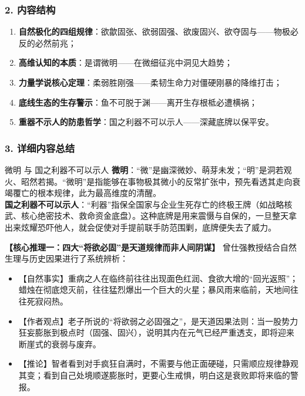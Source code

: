 \subsubsection{2. 内容结构}
\begin{enumerate}
    \item \textbf{自然极化的四组规律}：欲歙固张、欲弱固强、欲废固兴、欲夺固与——物极必反的必然前兆；
    \item \textbf{高维认知的本质}：是谓微明——在微细征兆中洞见大趋势；
    \item \textbf{力量学说核心定理}：柔弱胜刚强——柔韧生命力对僵硬刚暴的降维打击；
    \item \textbf{底线生态的生存警示}：鱼不可脱于渊——离开生存根柢必遭横祸；
    \item \textbf{重器不示人的防患哲学}：国之利器不可以示人——深藏底牌以保平安。
\end{enumerate}

\subsubsection{3. 详细内容总结}

\begin{ConceptBox}{微明 与 国之利器不可以示人}
\textbf{微明}：“微”是幽深微妙、萌芽未发；“明”是洞若观火、昭然若揭。“微明”是指能够在事物极其微小的反常扩张中，预先看透其走向衰竭覆亡的根本规律，此为最高维度的清醒。\\
\textbf{国之利器不可以示人}：“利器”指保全国家与企业生死存亡的终极王牌（如战略核武、核心绝密技术、救命资金底盘）。这种底牌是用来震慑与自保的，一旦整天拿出来炫耀恐吓他人，就会促使对手提前联手防范围剿，底牌便失去了威力。
\end{ConceptBox}

\noindent\textbf{【核心推理一：四大“将欲必固”是天道规律而非人间阴谋】}
曾仕强教授结合自然生理与历史因果进行了系统辨析：
\begin{itemize}
    \item 【自然事实】重病之人在临终前往往出现面色红润、食欲大增的“回光返照”；蜡烛在彻底熄灭前，往往猛烈爆出一个巨大的火星；暴风雨来临前，天地间往往死寂闷热。
    \item 【作者观点】老子所说的“将欲弱之必固强之”，是天道因果法则：当一股势力狂妄膨胀到极点时（固强、固兴），说明其内在元气已经严重透支，即将迎来断崖式的衰弱与废弃。
    \item 【推论】智者看到对手疯狂自满时，不需要与他正面硬碰，只需顺应规律静观其变；看到自己处境顺遂膨胀时，更要心生戒惧，明白这是衰败即将来临的警报。
\end{itemize}

